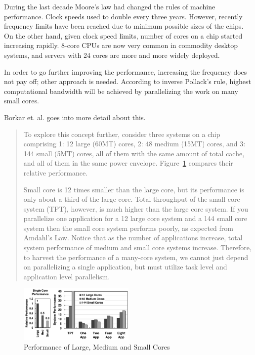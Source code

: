 \documentclass[english,11pt]{l4proj}
\begin{document}
During the last decade Moore's law had changed the rules of machine performance.
Clock speeds used to double every three years. However, recently frequency
limits have been reached due to minimum possible sizes of the chips. On the
other hand, given clock speed limits, number of cores on a chip started
increasing rapidly. 8-core CPUs are now very common in commodity desktop
systems, and servers with 24 cores are more and more widely deployed.

In order to go further improving the performance, increasing the frequency does
not pay off; other approach is needed. According to inverse Pollack's
rule\cite{pollack}, highest computational bandwidth will be achieved by
parallelizing the work on many small cores\cite{1kcorechips}.

Borkar et. al. goes into more detail about this.

\begin{quote}

    To explore this concept further, consider three systems on a chip
    comprising 1: 12 large (60MT) cores, 2: 48 medium (15MT) cores, and 3: 144
    small (5MT) cores, all of them with the same amount of total cache, and all
    of them in the same power envelope. Figure~\ref{fig:core_size_performance}
    compares their relative performance.

    Small core is 12 times smaller than the large core, but its performance is
    only about a third of the large core. Total throughput of the small core
    system (TPT), however, is much higher than the large core system. If you
    parallelize one application for a 12 large core system and a 144 small core
    system then the small core system performs poorly, as expected from Amdahl’s
    Law\cite{amdahls-law}. Notice that as the number of applications increase,
    total system performance of medium and small core systems increase.
    Therefore, to harvest the performance of a many-core system, we cannot just
    depend on parallelizing a single application, but must utilize task level
    and application level parallelism.

\end{quote}

\begin{figure}[h]
    \centering
    \includegraphics[width=0.5\textwidth]{images/pollack.png}
    \caption{Performance of Large, Medium and Small Cores}
    \label{fig:core_size_performance}
\end{figure}
\end{document}
